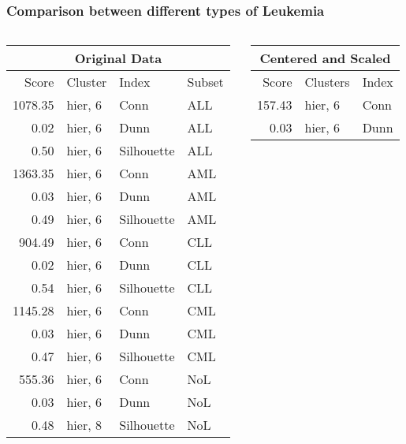 \documentclass[10pt,dvipsnames,table]{beamer}
\begin{document}
\begin{frame}
\frametitle{Comparison between different types of Leukemia}
\begin{columns}
\begin{column}{.5\textwidth}
\begin{table}[ht]
\centering
{\footnotesize
{}
\begin{tabular}{rlll}
\hline
\multicolumn{4}{c}{Original Data} \\
  \hline
 Score & Cluster & Index & Subset \\ 
  \hline
  1078.35 & hier, 6 & Conn & ALL \\ 
  0.02 & hier, 6 & Dunn & ALL \\ 
  0.50 & hier, 6 & Silhouette & ALL \\ 
  1363.35 & hier, 6 & Conn & AML \\ 
  0.03 & hier, 6 & Dunn & AML \\ 
  0.49 & hier, 6 & Silhouette & AML \\ 
  904.49 & hier, 6 & Conn & CLL \\ 
  0.02 & hier, 6 & Dunn & CLL \\ 
  0.54 & hier, 6 & Silhouette & CLL \\ 
  1145.28 & hier, 6 & Conn & CML \\ 
  0.03 & hier, 6 & Dunn & CML \\ 
  0.47 & hier, 6 & Silhouette & CML \\ 
  555.36 & hier, 6 & Conn & NoL \\ 
  0.03 & hier, 6 & Dunn & NoL \\ 
  0.48 & hier, 8 & Silhouette & NoL \\ 
   \hline
\end{tabular}
}
\end{table}
\end{column}
\begin{column}{.5\textwidth}
\begin{table}[ht]
\centering
{\footnotesize
{}
\begin{tabular}{rll}
\hline
\multicolumn{3}{c}{Centered and Scaled} \\
\hline
Score & Clusters & Index \\ 
  \hline
157.43 & hier, 6 & Conn \\ 
  0.03 & hier, 6 & Dunn \\ 

\end{tabular}}
\end{table}
\end{column}
\end{columns}
\end{frame}
\end{document}
